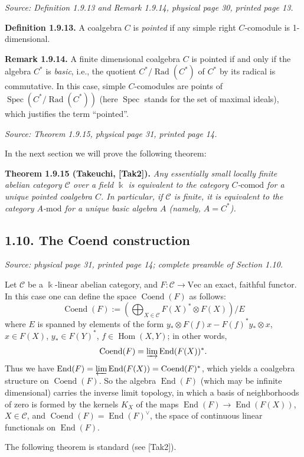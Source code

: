 \documentclass[11pt]{article}
\newcommand{\kk}{\Bbbk}
\newcommand{\cC}{\mathcal{C}}
\newcommand{\FiniteVec}{\mathrm{Vec}}
\newcommand{\Coend}{\operatorname{Coend}}
\newcommand{\End}{\operatorname{End}}
\newcommand{\Hom}{\operatorname{Hom}}
\newcommand{\comod}{\mathrm{comod}}
\newcommand{\modu}{\mathrm{mod}}
\newcommand{\Rad}{\operatorname{Rad}}
\newcommand{\Spec}{\operatorname{Spec}}
\newcommand{\sourceloc}[1]{\par\smallskip\noindent\textit{Source: #1.}\par\smallskip}
\begin{document}
\sourceloc{Definition 1.9.13 and Remark 1.9.14, physical page 30, printed page 13}
\noindent\textbf{Definition 1.9.13.}
A coalgebra $C$ is \emph{pointed} if any simple right $C$-comodule is
1-dimensional.

\noindent\textbf{Remark 1.9.14.}
A finite dimensional coalgebra $C$ is pointed if and only if the algebra
$C^*$ is \emph{basic}, i.e., the quotient $C^*/\Rad(C^*)$ of $C^*$ by its
radical is commutative. In this case, simple $C$-comodules are points of
$\Spec(C^*/\Rad(C^*))$ (here $\Spec$ stands for the set of maximal ideals),
which justifies the term ``pointed''.

\sourceloc{Theorem 1.9.15, physical page 31, printed page 14}
In the next section we will prove the following theorem:

\noindent\textbf{Theorem 1.9.15 (Takeuchi, [Tak2]).}
\emph{Any essentially small locally finite abelian category $\cC$ over a
field $\kk$ is equivalent to the category $C$-$\comod$ for a unique pointed
coalgebra $C$. In particular, if $\cC$ is finite, it is equivalent to the
category $A$-$\modu$ for a unique basic algebra $A$ (namely, $A=C^*$).}

\subsection*{1.10. The Coend construction}
\sourceloc{physical page 31, printed page 14; complete preamble of Section 1.10}
Let $\cC$ be a $\kk$-linear abelian category, and $F:\cC\to\FiniteVec$ an exact,
faithful functor. In this case one can define the space $\Coend(F)$ as follows:
\begin{equation}
\Coend(F):=\left(\bigoplus_{X\in\cC}F(X)^*\otimes F(X)\right)/E
\tag{1.9}\label{eq:original-1.9}
\end{equation}
where $E$ is spanned by elements of the form
$y_*\otimes F(f)x-F(f)^*y_*\otimes x$,
$x\in F(X)$, $y_*\in F(Y)^*$, $f\in\Hom(X,Y)$; in other words,
\[
\Coend(F)=\varinjlim\End(F(X))^*.
\]
Thus we have $\End(F)=\varprojlim\End(F(X))=\Coend(F)^*$, which yields
a coalgebra structure on $\Coend(F)$. So the algebra $\End(F)$ (which may
be infinite dimensional) carries the inverse limit topology, in which
a basis of neighborhoods of zero is formed by the kernels $K_X$ of the maps
$\End(F)\to\End(F(X))$, $X\in\cC$, and
$\Coend(F)=\End(F)^{\vee}$, the space of continuous linear functionals
on $\End(F)$.

The following theorem is standard (see [Tak2]).
\end{document}
